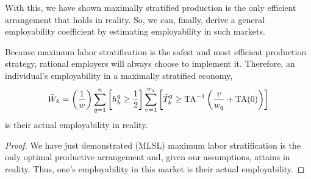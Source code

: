 \documentclass[hidelinks, nonatbib]{elsarticle}
\begin{document}
With this, we have shown maximally stratified production is the only efficient arrangement that holds in reality. So, we can, finally, derive a general employability coefficient by estimating employability in such markets.
\begin{get_theorem}[GET]
    Because maximum labor stratification is the safest and most efficient production strategy, rational employers will always choose to implement it. Therefore, an individual's employability in a maximally stratified economy,
    \begin{gather}
        \tilde{W}_k 
        =
        \left(
            \frac{1}{w}
        \right)
        \sum_{q=1}^{n}
        \left[
            h_{k}^{q}
            \geq
            \frac{1}{2}
        \right]
        \sum_{v=1}^{w_q}
        \left[
            \tilde{T}_{k}^{q}
            \geq
            \text{TA}^{-1}
            \left(
                \frac{v}{w_q}
                +
                \text{TA}(0)
            \right)
        \right]
    \end{gather}
    is their actual employability in reality.
    \begin{proof}
        We have just demonstrated (MLSL) maximum labor stratification is the only optimal productive arrangement and, given our assumptions, attains in reality. Thus, one's employability in this market is their actual employability.


\end{proof}
\end{get_theorem}
\end{document}
